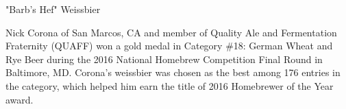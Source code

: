 \documentclass[fontsize=9pt,oneside]{scrbook}
\begin{document}
\mainmatter


\begin{recipe}{"Barb's Hef" Weissbier}

\begin{aboutblock}
Nick Corona of San Marcos, CA and member of Quality Ale and Fermentation Fraternity
(QUAFF) won a gold medal in Category \#18: German Wheat and Rye Beer during the 2016
National Homebrew Competition Final Round in Baltimore, MD. Corona's weissbier was
chosen as the best among 176 entries in the category, which helped him earn the title
of 2016 Homebrewer of the Year award. \sourceaha
\end{aboutblock}


\begin{methodandtiming}
 
\begin{mashsteps}
\end{mashsteps}

\begin{fermentationsteps}
\end{fermentationsteps}

\end{methodandtiming}

\recipebreak

\begin{ingredientsblock}

\begin{malts}
\end{malts}

\begin{hops}
\end{hops}


\end{ingredientsblock}

\end{recipe}


\end{document}
